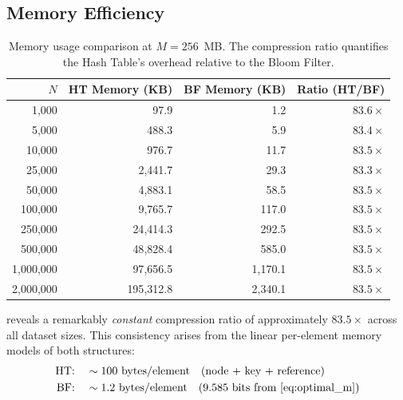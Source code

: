 \subsection{Memory Efficiency}
\label{subsec:memory}

\begin{table}[t]
\centering
\caption{Memory usage comparison at $M = 256$~MB. The compression ratio quantifies the Hash Table's overhead relative to the Bloom Filter.}
\label{tab:memory_comparison}
\begin{tabular}{@{}r r r r@{}}
\toprule
\textbf{$N$} & \textbf{HT Memory (KB)} & \textbf{BF Memory (KB)} & \textbf{Ratio (HT/BF)} \\
\midrule
1{,}000      & 97.9        & 1.2      & $83.6\times$ \\
5{,}000      & 488.3       & 5.9      & $83.4\times$ \\
10{,}000     & 976.7       & 11.7     & $83.5\times$ \\
25{,}000     & 2{,}441.7   & 29.3     & $83.3\times$ \\
50{,}000     & 4{,}883.1   & 58.5     & $83.5\times$ \\
100{,}000    & 9{,}765.7   & 117.0    & $83.5\times$ \\
250{,}000    & 24{,}414.3  & 292.5    & $83.5\times$ \\
500{,}000    & 48{,}828.4  & 585.0    & $83.5\times$ \\
1{,}000{,}000 & 97{,}656.5 & 1{,}170.1 & $83.5\times$ \\
2{,}000{,}000 & 195{,}312.8 & 2{,}340.1 & $83.5\times$ \\
\bottomrule
\end{tabular}
\end{table}

 reveals a remarkably \emph{constant} compression ratio of approximately $83.5\times$ across all dataset sizes. This consistency arises from the linear per-element memory models of both structures:
\begin{align*}
    \text{HT:} \quad &\sim 100~\text{bytes/element} \quad \text{(node + key + reference)} \\
    \text{BF:} \quad &\sim 1.2~\text{bytes/element} \quad \text{(9.585 bits from \Cref{eq:optimal_m})}
\end{align*}

